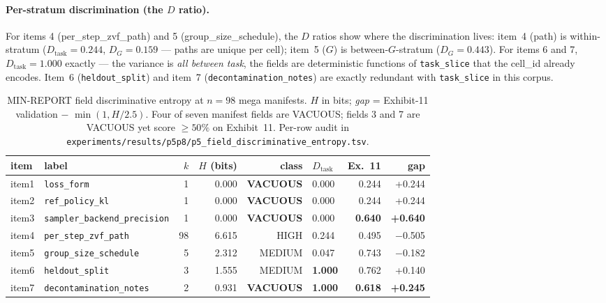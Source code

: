 \documentclass{article}  \usepackage[preprint,nonatbib]{neurips_2026} \usepackage[numbers]{natbib}
\begin{document}
\paragraph{Per-stratum discrimination (the $D$ ratio).}
For items 4 (per\_step\_zvf\_path) and 5 (group\_size\_schedule), the
$D$ ratios show where the discrimination lives: item~4 (path) is
within-stratum ($D_\text{task}=0.244$, $D_G=0.159$ --- paths are unique
per cell); item~5 ($G$) is between-$G$-stratum
($D_G = 0.443$). For items 6 and 7, $D_\text{task} = 1.000$ exactly ---
the variance is \emph{all between task}, the fields are deterministic
functions of \texttt{task\_slice} that the cell\_id already encodes.
Item~6 (\texttt{heldout\_split}) and item~7
(\texttt{decontamination\_notes}) are exactly redundant with
\texttt{task\_slice} in this corpus.

\begin{table}[t]
\centering\small
\caption{MIN-REPORT field discriminative entropy at $n{=}98$ mega
manifests. $H$ in bits; \emph{gap} = Exhibit-11 validation $-$
$\min(1, H/2.5)$. Four of seven manifest fields are VACUOUS; fields 3 and 7 are
VACUOUS yet score $\geq 50\%$ on Exhibit~11. Per-row audit in
\texttt{experiments/results/p5p8/p5\_field\_discriminative\_entropy.tsv}.}
\label{tab:p5-discriminative-entropy}
\begin{tabular}{llrrrlrr}
\toprule
item & label & $k$ & $H$ (bits) & class & $D_\text{task}$ & Ex.~11 & gap \\
\midrule
item1 & \texttt{loss\_form}                  & 1  & 0.000 & \textbf{VACUOUS} & 0.000 & 0.244 & +0.244 \\
item2 & \texttt{ref\_policy\_kl}              & 1  & 0.000 & \textbf{VACUOUS} & 0.000 & 0.244 & +0.244 \\
item3 & \texttt{sampler\_backend\_precision}  & 1  & 0.000 & \textbf{VACUOUS} & 0.000 & \textbf{0.640} & \textbf{+0.640} \\
item4 & \texttt{per\_step\_zvf\_path}         & 98 & 6.615 & HIGH            & 0.244 & 0.495 & $-$0.505 \\
item5 & \texttt{group\_size\_schedule}        & 5  & 2.312 & MEDIUM          & 0.047 & 0.743 & $-$0.182 \\
item6 & \texttt{heldout\_split}              & 3  & 1.555 & MEDIUM          & \textbf{1.000} & 0.762 & +0.140 \\
item7 & \texttt{decontamination\_notes}      & 2  & 0.931 & \textbf{VACUOUS} & \textbf{1.000} & \textbf{0.618} & \textbf{+0.245} \\
\bottomrule
\end{tabular}
\end{table}
\end{document}
